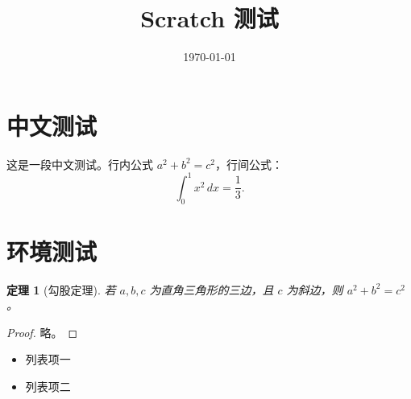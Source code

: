 \documentclass[UTF8]{ctexart}
\title{Scratch 测试}
\author{}
\date{\today}
\newtheorem{theorem}{定理}[section]
\begin{document}
\maketitle

\section{中文测试}
这是一段中文测试。行内公式 $a^2+b^2=c^2$，行间公式：
\[
  \int_0^1 x^2 \, dx = \frac{1}{3}.
\]

\section{环境测试}
\begin{theorem}[勾股定理]
若 $a,b,c$ 为直角三角形的三边，且 $c$ 为斜边，则 $a^2+b^2=c^2$。
\end{theorem}

\begin{proof}
略。
\end{proof}

\begin{itemize}
  \item 列表项一
  \item 列表项二
\end{itemize}
\end{document}
